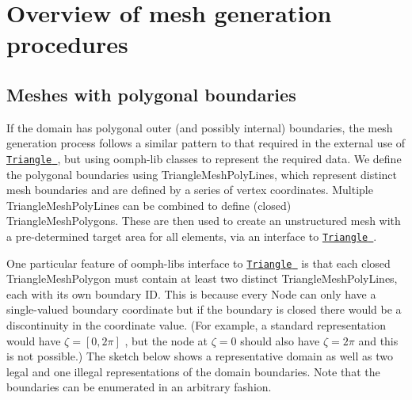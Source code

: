 \hypertarget{index_overview}{}\section{Overview of mesh generation procedures}\label{index_overview}
\hypertarget{index_polygonal}{}\subsection{Meshes with polygonal boundaries}\label{index_polygonal}
If the domain has polygonal outer (and possibly internal) boundaries, the mesh generation process follows a similar pattern to that required in the external use of \href{http://www.cs.cmu.edu/~quake/triangle.html}{\tt {\ttfamily Triangle} }, but using {\ttfamily oomph-\/lib} classes to represent the required data. We define the polygonal boundaries using {\ttfamily Triangle\+Mesh\+Poly\+Lines}, which represent distinct mesh boundaries and are defined by a series of vertex coordinates. Multiple {\ttfamily Triangle\+Mesh\+Poly\+Lines} can be combined to define (closed) {\ttfamily Triangle\+Mesh\+Polygons}. These are then used to create an unstructured mesh with a pre-\/determined target area for all elements, via an interface to \href{http://www.cs.cmu.edu/~quake/triangle.html}{\tt {\ttfamily Triangle} }.

One particular feature of {\ttfamily oomph-\/lib\textquotesingle{}s} interface to \href{http://www.cs.cmu.edu/~quake/triangle.html}{\tt {\ttfamily Triangle} } is that each closed {\ttfamily Triangle\+Mesh\+Polygon} must contain at least two distinct {\ttfamily Triangle\+Mesh\+Poly\+Lines}, each with its own boundary ID. This is because every {\ttfamily Node} can only have a single-\/valued boundary coordinate but if the boundary is closed there would be a discontinuity in the coordinate value. (For example, a standard representation would have $ \zeta = [0,2\pi] $ , but the node at $\zeta=0$ should also have $ \zeta=2\pi $ and this is not possible.) The sketch below shows a representative domain as well as two legal and one illegal representations of the domain boundaries. Note that the boundaries can be enumerated in an arbitrary fashion.

